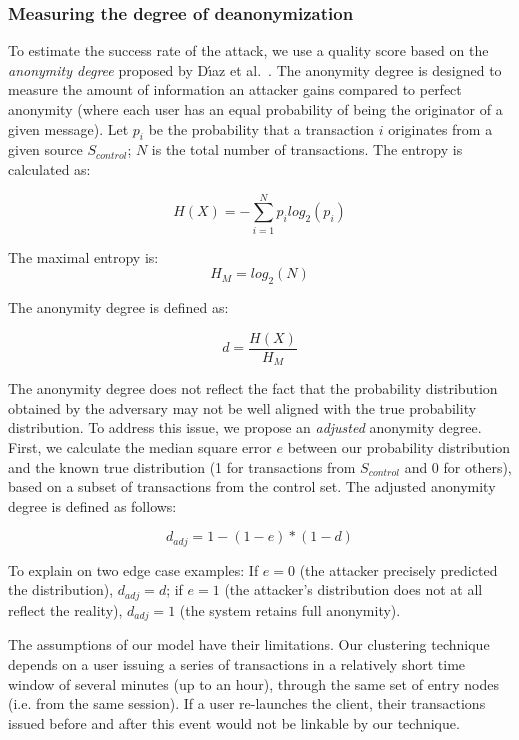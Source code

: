 \subsubsection{Measuring the degree of deanonymization}

To estimate the success rate of the attack, we use a quality score based on the \textit{anonymity degree} proposed by D{\'{\i}}az et al.~\cite{Diaz2002}.
The anonymity degree is designed to measure the amount of information an attacker gains compared to perfect anonymity (where each user has an equal probability of being the originator of a given message).
Let $p_i$ be the probability that a transaction $i$ originates from a given source $S_{control}$; $N$ is the total number of transactions.
The entropy is calculated as:

\[
H(X) = -\sum_{i=1}^N p_i log_2(p_i)
\]

The maximal entropy is:
\[
H_M = log_2(N)
\]

The anonymity degree is defined as:

\[
d = \frac{H(X)}{H_M}
\]

The anonymity degree does not reflect the fact that the probability distribution obtained by the adversary may not be well aligned with the true probability distribution.
To address this issue, we propose an \textit{adjusted} anonymity degree.
First, we calculate the median square error $e$ between our probability distribution and the known true distribution (1 for transactions from $S_{control}$ and 0 for others), based on a subset of transactions from the control set.
The adjusted anonymity degree is defined as follows:

\[
d_{adj} = 1 - (1 - e) * (1 - d)
\]

To explain on two edge case examples: If $e = 0$ (the attacker precisely predicted the distribution), $d_{adj} = d$; if $e = 1$ (the attacker's distribution does not at all reflect the reality), $d_{adj} = 1$ (the system retains full anonymity).

The assumptions of our model have their limitations.
Our clustering technique depends on a user issuing a series of transactions in a relatively short time window of several minutes (up to an hour), through the same set of entry nodes (i.e. from the same session).
If a user re-launches the client, their transactions issued before and after this event would not be linkable by our technique.


